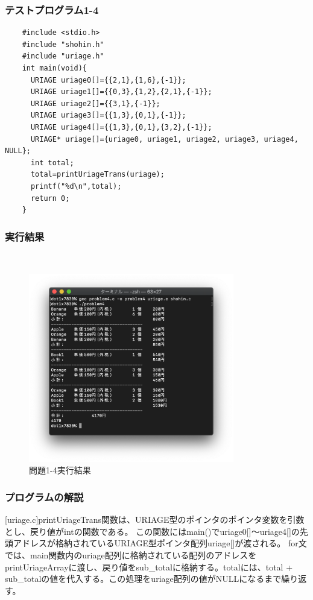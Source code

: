 \documentclass[10pt]{article}
\begin{document}
\subsubsection{テストプログラム1-4}
\begin{lstlisting}
    #include <stdio.h>
    #include "shohin.h"
    #include "uriage.h"
    int main(void){
      URIAGE uriage0[]={{2,1},{1,6},{-1}};
      URIAGE uriage1[]={{0,3},{1,2},{2,1},{-1}};
      URIAGE uriage2[]={{3,1},{-1}};
      URIAGE uriage3[]={{1,3},{0,1},{-1}};
      URIAGE uriage4[]={{1,3},{0,1},{3,2},{-1}};
      URIAGE* uriage[]={uriage0, uriage1, uriage2, uriage3, uriage4, NULL};
      int total;
      total=printUriageTrans(uriage);
      printf("%d\n",total);
      return 0;
    }
\end{lstlisting}

\subsubsection{実行結果}
　
\begin{figure}[H]
	\centering
	\includegraphics[width=0.8\textwidth]{problem1-4.png}
	\caption{問題1-4実行結果}
\end{figure}

\subsubsection{プログラムの解説}
[uriage.c]printUriageTrans関数は、URIAGE型のポインタのポインタ変数を引数とし、戻り値がintの関数である。
この関数にはmain()でuriage0[]～uriage4[]の先頭アドレスが格納されているURIAGE型ポインタ配列uriage[]が渡される。
for文では、main関数内のuriage配列に格納されている配列のアドレスをprintUriageArrayに渡し、戻り値をsub\_totalに格納する。totalには、total + sub\_totalの値を代入する。この処理をuriage配列の値がNULLになるまで繰り返す。
\pagebreak
\end{document}
